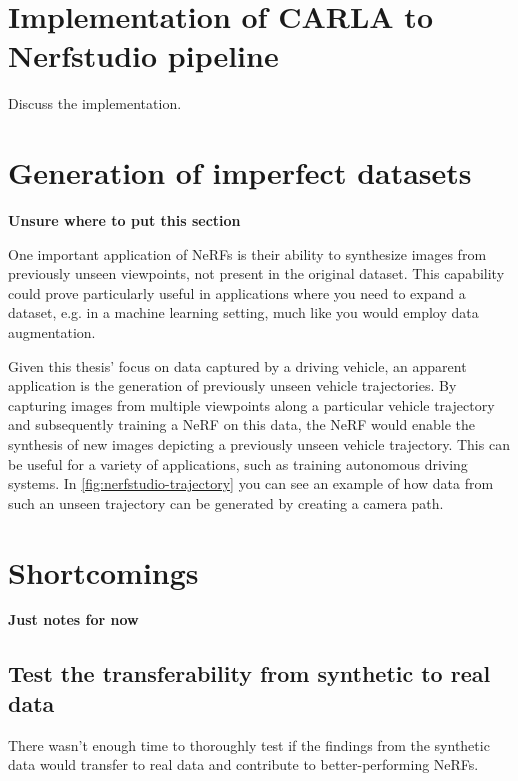 




\section{Implementation of CARLA to Nerfstudio pipeline}
Discuss the implementation.











\section{Generation of imperfect datasets}
\textbf{Unsure where to put this section}

One important application of NeRFs is their ability to synthesize images from previously unseen viewpoints, not present in the original dataset. This capability could prove particularly useful in applications where you need to expand a dataset, e.g. in a machine learning setting, much like you would employ data augmentation.

Given this thesis' focus on data captured by a driving vehicle, an apparent application is the generation of previously unseen vehicle trajectories. By capturing images from multiple viewpoints along a particular vehicle trajectory and subsequently training a NeRF on this data, the NeRF would enable the synthesis of new images depicting a previously unseen vehicle trajectory. This can be useful for a variety of applications, such as training autonomous driving systems. In \autoref{fig:nerfstudio-trajectory} you can see an example of how data from such an unseen trajectory can be generated by creating a camera path.
















\section{Shortcomings}
\textbf{Just notes for now}
\subsection{Test the transferability from synthetic to real data}
There wasn't enough time to thoroughly test if the findings from the synthetic data would transfer to real data and contribute to better-performing NeRFs.